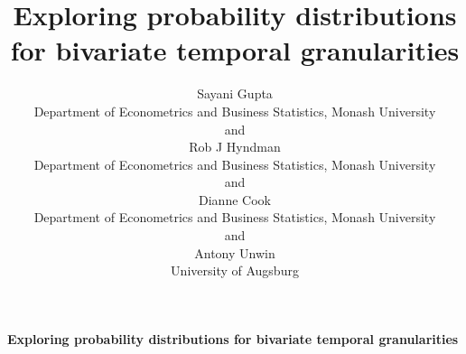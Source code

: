 \documentclass[12pt]{article}
\newcommand{\blind}{}
\begin{document}
\def\spacingset#1{\renewcommand{\baselinestretch}%
{#1}\small\normalsize} \spacingset{1}



\blind
{
  \title{\bf Exploring probability distributions for bivariate temporal granularities}

  \author{
        Sayani Gupta \\
    Department of Econometrics and Business Statistics, Monash University\\
     and \\     Rob J Hyndman \\
    Department of Econometrics and Business Statistics, Monash University\\
     and \\     Dianne Cook \\
    Department of Econometrics and Business Statistics, Monash University\\
     and \\     Antony Unwin \\
    University of Augsburg\\
      }
  \maketitle
} \fi

\blind
{
  \bigskip
  \bigskip
  \bigskip
  \begin{center}
    {\LARGE\bf Exploring probability distributions for bivariate temporal granularities}
  \end{center}
  \medskip
} \fi
\end{document}
